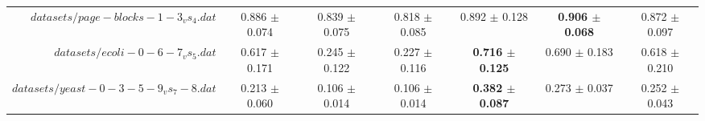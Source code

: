 \begin{table}[!ht]
{\begin{tabular}{r c c c c c c}
$datasets/page-blocks-1-3_vs_4.dat$ & 0.886 $\pm$ 0.074 & 0.839 $\pm$ 0.075 & 0.818 $\pm$ 0.085 & 0.892 $\pm$ 0.128 & \textbf{0.906 $\pm$ 0.068} & 0.872 $\pm$ 0.097 \\
$datasets/ecoli-0-6-7_vs_5.dat$ & 0.617 $\pm$ 0.171 & 0.245 $\pm$ 0.122 & 0.227 $\pm$ 0.116 & \textbf{0.716 $\pm$ 0.125} & 0.690 $\pm$ 0.183 & 0.618 $\pm$ 0.210 \\
$datasets/yeast-0-3-5-9_vs_7-8.dat$ & 0.213 $\pm$ 0.060 & 0.106 $\pm$ 0.014 & 0.106 $\pm$ 0.014 & \textbf{0.382 $\pm$ 0.087} & 0.273 $\pm$ 0.037 & 0.252 $\pm$ 0.043 \\
\end{tabular}}
\end{table}
